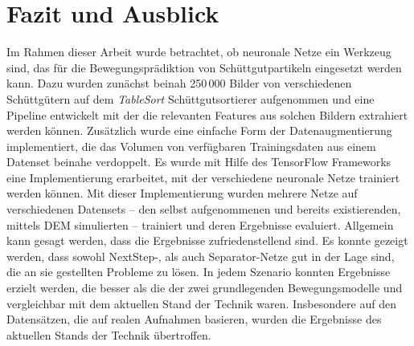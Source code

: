 \chapter{Fazit und Ausblick}
\label{cap:fazit}

Im Rahmen dieser Arbeit wurde betrachtet, ob neuronale Netze ein Werkzeug sind, das für die Bewegungsprädiktion von Schüttgutpartikeln eingesetzt werden kann.
Dazu wurden zunächst beinah 250\,000 Bilder von verschiedenen Schüttgütern auf dem \textit{TableSort} Schüttgutsortierer aufgenommen 
und eine Pipeline entwickelt mit der die relevanten Features aus solchen Bildern extrahiert werden können.
Zusätzlich wurde eine einfache Form der Datenaugmentierung implementiert, die das Volumen von verfügbaren Trainingsdaten aus einem Datenset beinahe verdoppelt.
Es wurde mit Hilfe des TensorFlow Frameworks eine Implementierung erarbeitet, mit der verschiedene neuronale Netze trainiert werden können.
Mit dieser Implementierung wurden mehrere Netze auf verschiedenen Datensets -- den selbst aufgenommenen und bereits existierenden, mittels DEM simulierten -- trainiert und deren Ergebnisse evaluiert.
Allgemein kann gesagt werden, dass die Ergebnisse zufriedenstellend sind.
Es konnte gezeigt werden, dass sowohl NextStep-, als auch Separator-Netze gut in der Lage sind, die an sie gestellten Probleme zu lösen.
In jedem Szenario konnten Ergebnisse erzielt werden, die besser als die der zwei grundlegenden Bewegungsmodelle
und vergleichbar mit dem aktuellen Stand der Technik waren.
Insbesondere auf den Datensätzen, die auf realen Aufnahmen basieren, wurden die Ergebnisse des aktuellen Stands der Technik übertroffen.





